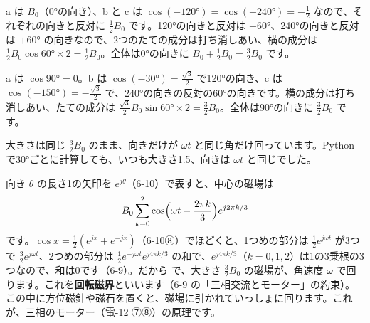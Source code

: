 a は $B_0$（0°の向き）、b と c は $\cos(-120°)=\cos(-240°)=-\tfrac12$ なので、それぞれの向きと反対に $\tfrac12B_0$ です。120°の向きと反対は $-60°$、240°の向きと反対は $+60°$ の向きなので、2つのたての成分は打ち消しあい、横の成分は $\tfrac12B_0\cos60°\times2=\tfrac12B_0$。全体は0°の向きに $B_0+\tfrac12B_0=\tfrac32B_0$ です。

a は $\cos90°=0$。b は $\cos(-30°)=\tfrac{\sqrt3}{2}$ で120°の向き、c は $\cos(-150°)=-\tfrac{\sqrt3}{2}$ で、240°の向きの反対の60°の向きです。横の成分は打ち消しあい、たての成分は $\tfrac{\sqrt3}{2}B_0\sin60°\times2=\tfrac32B_0$。全体は90°の向きに $\tfrac32B_0$ です。

\noindent 大きさは同じ $\tfrac32B_0$ のまま、向きだけが $\omega t$ と同じ角だけ回っています。Python で30°ごとに計算しても、いつも大きさ1.5、向きは $\omega t$ と同じでした。

\begin{bkfigure}
\label{ph:電-11:fig-rot}
\end{bkfigure}

向き $\theta$ の長さ1の矢印を $e^{j\theta}$（6-10）で表すと、中心の磁場は
\[B_0\sum_{k=0}^{2}\cos\Bigl(\omega t-\frac{2\pi k}{3}\Bigr)e^{j2\pi k/3}\]
です。$\cos x=\tfrac12(e^{jx}+e^{-jx})$（6-10⑧）でほどくと、1つめの部分は $\tfrac12e^{j\omega t}$ が3つで $\tfrac32e^{j\omega t}$、2つめの部分は $\tfrac12e^{-j\omega t}e^{j4\pi k/3}$ の和で、$e^{j4\pi k/3}$（$k=0,1,2$）は1の3乗根の3つなので、和は0です（6-9）。だから
で、大きさ $\tfrac32B_0$ の磁場が、角速度 $\omega$ で回ります。これを\textbf{回転磁界}といいます（6-9 の「三相交流とモーター」の約束）。この中に方位磁針や磁石を置くと、磁場に引かれていっしょに回ります。これが、三相のモーター（電-12 ⑦⑧）の原理です。

